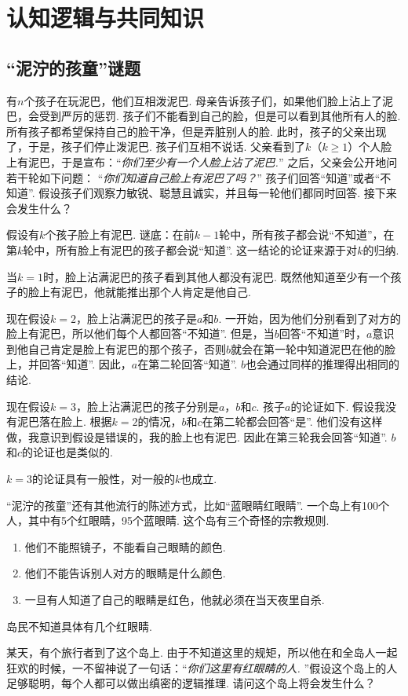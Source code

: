 \chapter{认知逻辑与共同知识}\label{chap:epistemic-logic}

\begingroup
\newcommand{\pref}{Chapters/epistemic-logic/figures}

\section{“泥泞的孩童”谜题}
有$n$个孩子在玩泥巴，他们互相泼泥巴. 母亲告诉孩子们，如果他们脸上沾上了泥巴，会受到严厉的惩罚. 孩子们不能看到自己的脸，但是可以看到其他所有人的脸. 所有孩子都希望保持自己的脸干净，但是弄脏别人的脸. 此时，孩子的父亲出现了，于是，孩子们停止泼泥巴. 孩子们互相不说话. 父亲看到了$k$（$k\geq 1$）个人脸上有泥巴，于是宣布：“\emph{你们至少有一个人脸上沾了泥巴.}” 之后，父亲会公开地问若干轮如下问题： “\emph{你们知道自己脸上有泥巴了吗？}” 孩子们回答“知道”或者“不知道”. 假设孩子们观察力敏锐、聪慧且诚实，并且每一轮他们都同时回答. 接下来会发生什么？

假设有$k$个孩子脸上有泥巴. 谜底：在前$k-1$轮中，所有孩子都会说“不知道”，在第$k$轮中，所有脸上有泥巴的孩子都会说“知道”. 这一结论的论证来源于对$k$的归纳.

当$k=1$时，脸上沾满泥巴的孩子看到其他人都没有泥巴. 既然他知道至少有一个孩子的脸上有泥巴，他就能推出那个人肯定是他自己. 

现在假设$k=2$，脸上沾满泥巴的孩子是$a$和$b$. 一开始，因为他们分别看到了对方的脸上有泥巴，所以他们每个人都回答“不知道”. 但是，当$b$回答“不知道”时，$a$意识到他自己肯定是脸上有泥巴的那个孩子，否则$b$就会在第一轮中知道泥巴在他的脸上，并回答“知道”. 因此，$a$在第二轮回答“知道”. $b$也会通过同样的推理得出相同的结论. 

 现在假设$k=3$，脸上沾满泥巴的孩子分别是$a$，$b$和$c$. 孩子$a$的论证如下. 假设我没有泥巴落在脸上. 根据$k=2$的情况，$b$和$c$在第二轮都会回答“是”. 他们没有这样做，我意识到假设是错误的，我的脸上也有泥巴. 因此在第三轮我会回答“知道”. $b$和$c$的论证也是类似的.

$k=3$的论证具有一般性，对一般的$k$也成立.

\begin{remark}
“泥泞的孩童”还有其他流行的陈述方式，比如“蓝眼睛红眼睛”. 一个岛上有100个人，其中有5个红眼睛，95个蓝眼睛. 这个岛有三个奇怪的宗教规则.
    \begin{enumerate}
        \item 他们不能照镜子，不能看自己眼睛的颜色. 
        \item 他们不能告诉别人对方的眼睛是什么颜色. 
        \item 一旦有人知道了自己的眼睛是红色，他就必须在当天夜里自杀.
    \end{enumerate}
岛民不知道具体有几个红眼睛. 

某天，有个旅行者到了这个岛上. 由于不知道这里的规矩，所以他在和全岛人一起狂欢的时候，一不留神说了一句话：“\emph{你们这里有红眼睛的人. }”假设这个岛上的人足够聪明，每个人都可以做出缜密的逻辑推理. 请问这个岛上将会发生什么？
\end{remark}

